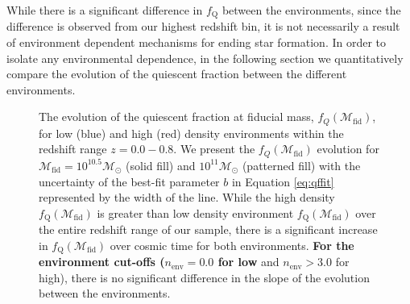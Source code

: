 \documentclass{emulateapj}
\begin{document}
While there is a significant difference in $f_{\mathrm{Q}}$ between the
environments, since the difference is observed from our highest
redshift bin, it is not necessarily a result of environment dependent
mechanisms for ending star formation. In order to isolate any
environmental dependence, in the following section we quantitatively
compare the evolution of the quiescent fraction between the different
environments.

\begin{figure}
    \begin{center}
        \leavevmode
        \caption{The evolution of the quiescent fraction at fiducial
          mass, $f_{Q}(\mathcal{M}_{\mathrm{fid}})$, for low (blue) and
          high (red) density environments within the redshift range $z
          = 0.0 - 0.8$. We present the $f_{Q}(\mathcal{M}_{\mathrm{fid}})$
          evolution for $\mathcal{M}_{\mathrm{fid}} = 10^{10.5}
          \mathcal{M}_\odot$ (solid fill) and $10^{11}
          \mathcal{M}_\odot$ (patterned fill) with the uncertainty of
          the best-fit parameter $b$ in Equation \ref{eq:qffit}
          represented by the width of the line. While the high density $f_{\mathrm{Q}}(\mathcal{M}_{\mathrm{fid}})$ is greater than low density environment $f_{\mathrm{Q}}(\mathcal{M}_{\mathrm{fid}})$ over the entire redshift range of our sample, there is a significant increase in $f_{\mathrm{Q}}(\mathcal{M}_{\mathrm{fid}})$ over cosmic time for both environments. {\bf For the environment cut-offs ($n_{\mathrm{env}} =0.0 $ for low }and $n_{\mathrm{env}} > 3.0$ for high), there is no significant difference in the slope of the evolution between the environments.}         \label{fig:qffit}
    \end{center}
\end{figure}
\end{document}
